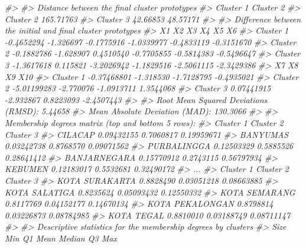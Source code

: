 \documentclass[
  oneside]{book}
\newenvironment{Shaded}{\begin{snugshade}}{\end{snugshade}}
\newcommand{\CommentTok}[1]{\textcolor[rgb]{0.56,0.35,0.01}{\textit{#1}}}
\begin{document}
\begin{Shaded}
\begin{Highlighting}[]
\CommentTok{\#\textgreater{} }
\CommentTok{\#\textgreater{} Distance between the final cluster prototypes}
\CommentTok{\#\textgreater{}           Cluster 1 Cluster 2}
\CommentTok{\#\textgreater{} Cluster 2 165.71763          }
\CommentTok{\#\textgreater{} Cluster 3  42.66853  48.57171}
\CommentTok{\#\textgreater{} }
\CommentTok{\#\textgreater{} Difference between the initial and final cluster prototypes}
\CommentTok{\#\textgreater{}                   X1        X2         X3         X4         X5         X6}
\CommentTok{\#\textgreater{} Cluster 1 {-}0.4652294 {-}1.326697 {-}0.1775916 {-}1.0339977 {-}0.4833119 {-}0.3151670}
\CommentTok{\#\textgreater{} Cluster 2 {-}0.1882786 {-}1.628907  0.4510540 {-}0.7705855 {-}0.5814383 {-}0.5496647}
\CommentTok{\#\textgreater{} Cluster 3 {-}1.3617618  0.115821 {-}3.2026942 {-}1.1829516 {-}2.5061115 {-}2.3429386}
\CommentTok{\#\textgreater{}                    X7        X8         X9        X10}
\CommentTok{\#\textgreater{} Cluster 1 {-}0.37468801 {-}1.318530 {-}1.7128795 {-}0.4935021}
\CommentTok{\#\textgreater{} Cluster 2 {-}5.01199283 {-}2.770076 {-}1.0913711  1.3544068}
\CommentTok{\#\textgreater{} Cluster 3  0.07441915 {-}2.932867  0.8223093 {-}2.4507443}
\CommentTok{\#\textgreater{} }
\CommentTok{\#\textgreater{} Root Mean Squared Deviations (RMSD): 5.44658 }
\CommentTok{\#\textgreater{} Mean Absolute Deviation (MAD): 130.3066 }
\CommentTok{\#\textgreater{} }
\CommentTok{\#\textgreater{} Membership degrees matrix (top and bottom 5 rows): }
\CommentTok{\#\textgreater{}               Cluster 1 Cluster 2  Cluster 3}
\CommentTok{\#\textgreater{} CILACAP      0.09432155 0.7060817 0.19959671}
\CommentTok{\#\textgreater{} BANYUMAS     0.03242738 0.8768570 0.09071562}
\CommentTok{\#\textgreater{} PURBALINGGA  0.12503329 0.5885526 0.28641412}
\CommentTok{\#\textgreater{} BANJARNEGARA 0.15770912 0.2743115 0.56797934}
\CommentTok{\#\textgreater{} KEBUMEN      0.12183017 0.5532681 0.32490172}
\CommentTok{\#\textgreater{} ...}
\CommentTok{\#\textgreater{}                 Cluster 1  Cluster 2  Cluster 3}
\CommentTok{\#\textgreater{} KOTA SURAKARTA  0.8828490 0.03051218 0.08663885}
\CommentTok{\#\textgreater{} KOTA SALATIGA   0.8235624 0.05093432 0.12550332}
\CommentTok{\#\textgreater{} KOTA SEMARANG   0.8117769 0.04152177 0.14670134}
\CommentTok{\#\textgreater{} KOTA PEKALONGAN 0.8798814 0.03226873 0.08784985}
\CommentTok{\#\textgreater{} KOTA TEGAL      0.8810010 0.03188749 0.08711147}
\CommentTok{\#\textgreater{} }
\CommentTok{\#\textgreater{} Descriptive statistics for the membership degrees by clusters}
\CommentTok{\#\textgreater{}           Size       Min        Q1      Mean    Median        Q3       Max}

\end{Highlighting}
\end{Shaded}
\end{document}
